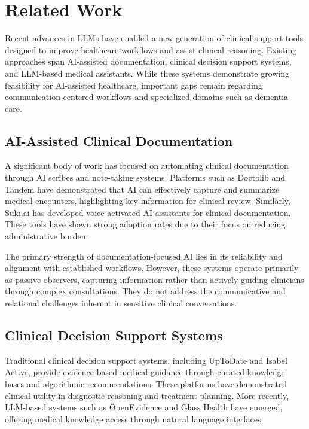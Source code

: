\newpage
\section{Related Work}\label{sec:relatedwork}

Recent advances in LLMs have enabled a new generation of clinical support tools designed to improve healthcare workflows and assist clinical reasoning. Existing approaches span AI-assisted documentation, clinical decision support systems, and LLM-based medical assistants. While these systems demonstrate growing feasibility for AI-assisted healthcare, important gaps remain regarding communication-centered workflows and specialized domains such as dementia care.

\subsection{AI-Assisted Clinical Documentation}

A significant body of work has focused on automating clinical documentation through AI scribes and note-taking systems. Platforms such as Doctolib and Tandem have demonstrated that AI can effectively capture and summarize medical encounters, highlighting key information for clinical review. Similarly, Suki.ai has developed voice-activated AI assistants for clinical documentation. These tools have shown strong adoption rates due to their focus on reducing administrative burden.

The primary strength of documentation-focused AI lies in its reliability and alignment with established workflows. However, these systems operate primarily as passive observers, capturing information rather than actively guiding clinicians through complex consultations. They do not address the communicative and relational challenges inherent in sensitive clinical conversations.

\subsection{Clinical Decision Support Systems}

Traditional clinical decision support systems, including UpToDate and Isabel Active, provide evidence-based medical guidance through curated knowledge bases and algorithmic recommendations. These platforms have demonstrated clinical utility in diagnostic reasoning and treatment planning. More recently, LLM-based systems such as OpenEvidence and Glass Health have emerged, offering medical knowledge access through natural language interfaces.

